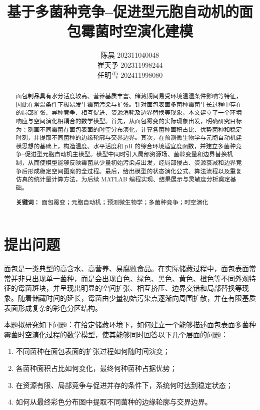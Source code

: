 \documentclass[12pt,a4paper]{ctexart}
\title{基于多菌种竞争--促进型元胞自动机的面包霉菌时空演化建模}
\author{陈晨 202311040048 \\
崔天予 202311998244\\
任明雪 202411998080\\}
\date{}
\begin{document}
\maketitle

\begin{abstract}
面包制品具有水分活度较高、营养基质丰富、储藏期间易受环境温湿条件影响等特征，因此在常温条件下极易发生霉菌污染与扩张。针对面包表面多菌种霉菌生长过程中存在的局部扩张、异种竞争、相互促进、资源消耗及边界替换等现象，本文建立了一个环境响应与空间演化相耦合的数学模型。首先，从面包霉变的实际现象出发，明确研究目标为：刻画不同霉菌在面包表面的时空分布演化，计算各菌种面积占比、优势菌种和稳定时刻，并提取不同菌种的边缘轮廓与交界边界。其次，在预测微生物学与元胞自动机建模思想的基础上，构造温度、水平活度和 pH 的综合环境适宜度函数，并建立多菌种竞争--促进型元胞自动机主模型。模型中同时引入局部资源场、菌龄变量和边界替换机制，从而使模型能够反映霉菌从少量初始污染点出发，经局部侵占、资源衰减和边界竞争后形成稳定空间图案的全过程。最后，给出模型的状态演化公式、算法流程以及重复仿真的统计量计算方法，为后续 MATLAB 编程实现、结果展示与灵敏度分析奠定基础。

\textbf{关键词：} 面包霉变；元胞自动机；预测微生物学；多菌种竞争；时空演化
\end{abstract}


\maketitle
\section{提出问题}

面包是一类典型的高含水、高营养、易腐败食品。在实际储藏过程中，面包表面常常并非只出现单一菌种，而是会出现白色、绿色、黑色、黄色、橙色等不同外观特征的霉菌斑块，并呈现出明显的空间扩张、相互挤压、边界交错和局部替换等现象。随着储藏时间的延长，霉菌由少量初始污染点逐渐向周围扩散，并在有限基质表面形成复杂的彩色分区结构。

本题拟研究如下问题：在给定储藏环境下，如何建立一个能够描述面包表面多菌种霉菌时空演化过程的数学模型，使其能够同时回答以下几个层面的问题：
\begin{enumerate}
    \item 不同菌种在面包表面的扩张过程如何随时间演变；
    \item 各菌种面积占比如何变化，最终何种菌种占据优势；
    \item 在资源有限、局部竞争与促进并存的条件下，系统何时达到稳定状态；
    \item 如何从最终彩色分布图中提取不同菌种的边缘轮廓与交界边界。
\end{enumerate}
\end{document}
